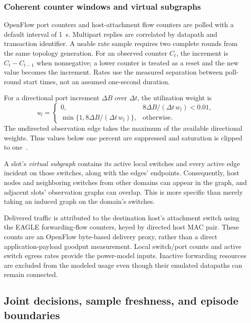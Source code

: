 \documentclass[11pt,a4paper]{article}
\begin{document}
\subsubsection{Coherent counter windows and virtual subgraphs}

OpenFlow port counters and host-attachment flow counters are polled with a
default interval of 1~s. Multipart replies are correlated by datapath and
transaction identifier. A usable rate sample requires two complete rounds from
the same topology generation. For an observed counter $C_t$, the increment is
$C_t-C_{t-1}$ when nonnegative; a lower counter is treated as a reset and the
new value becomes the increment. Rates use the measured separation between
poll-round start times, not an assumed one-second duration.

For a directional port increment $\Delta B$ over $\Delta t$, the utilization
weight is
\begin{equation}
 u_l=\begin{cases}
 0, & 8\Delta B/(\Delta t\,w_l)<0.01,\\
 \min\{1,8\Delta B/(\Delta t\,w_l)\}, & \text{otherwise}.
 \end{cases}
\end{equation}
The undirected observation edge takes the maximum of the available directional
weights. Thus values below one percent are suppressed and saturation is clipped
to one~\cite{code-routing}.

A slot's \emph{virtual subgraph} contains its active local switches and every
active edge incident on those switches, along with the edges' endpoints.
Consequently, host nodes and neighboring switches from other domains can appear
in the graph, and adjacent slots' observation graphs can overlap. This is more
specific than merely taking an induced graph on the domain's switches.

Delivered traffic is attributed to the destination host's attachment switch
using the EAGLE forwarding-flow counters, keyed by directed host MAC pair.
These counts are an OpenFlow byte-based delivery proxy, rather than a direct
application-payload goodput measurement. Local switch/port counts and active
switch egress rates provide the power-model inputs. Inactive forwarding
resources are excluded from the modeled usage even though their emulated
datapaths can remain connected.

\subsection{Joint decisions, sample freshness, and episode boundaries}
\label{sec:episodes}
\end{document}
